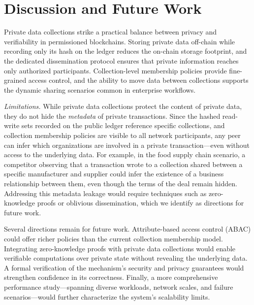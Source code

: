 \section{Discussion and Future Work}

Private data collections strike a practical balance between privacy and verifiability in permissioned blockchains. Storing private data off-chain while recording only its hash on the ledger reduces the on-chain storage footprint, and the dedicated dissemination protocol ensures that private information reaches only authorized participants. Collection-level membership policies provide fine-grained access control, and the ability to move data between collections supports the dynamic sharing scenarios common in enterprise workflows.

\textit{Limitations.} While private data collections protect the content of private data, they do not hide the \textit{metadata} of private transactions. Since the hashed read-write sets recorded on the public ledger reference specific collections, and collection membership policies are visible to all network participants, any peer can infer which organizations are involved in a private transaction---even without access to the underlying data. For example, in the food supply chain scenario, a competitor observing that a transaction wrote to a collection shared between a specific manufacturer and supplier could infer the existence of a business relationship between them, even though the terms of the deal remain hidden. Addressing this metadata leakage would require techniques such as zero-knowledge proofs or oblivious dissemination, which we identify as directions for future work.

Several directions remain for future work. Attribute-based access control (ABAC) could offer richer policies than the current collection membership model. Integrating zero-knowledge proofs with private data collections would enable verifiable computations over private state without revealing the underlying data. A formal verification of the mechanism's security and privacy guarantees would strengthen confidence in its correctness. Finally, a more comprehensive performance study---spanning diverse workloads, network scales, and failure scenarios---would further characterize the system's scalability limits.
